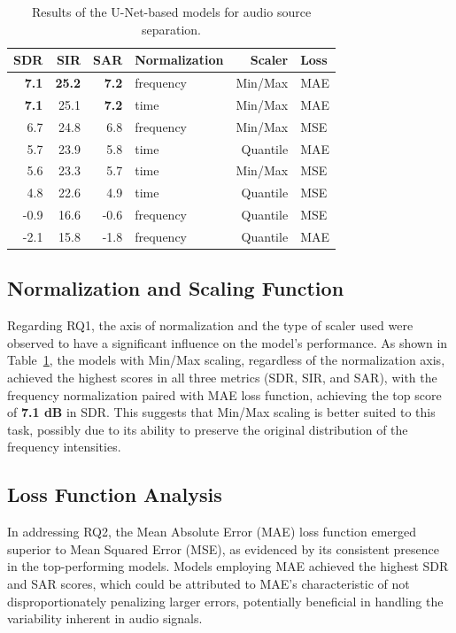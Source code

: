 \documentclass[conference]{IEEEtran}
\begin{document}
\begin{table}[htbp]
\centering
\caption{Results of the U-Net-based models for audio source separation.}
\label{table:results}
\begin{tabular}{rrrlrl}
\toprule
SDR & SIR & SAR & Normalization & Scaler & Loss \\
\midrule
\textbf{7.1} & \textbf{25.2} & \textbf{7.2} & frequency & Min/Max & MAE \\
\textbf{7.1} & 25.1 & \textbf{7.2} & time & Min/Max & MAE \\
6.7 & 24.8 & 6.8 & frequency & Min/Max & MSE \\
5.7 & 23.9 & 5.8 & time & Quantile & MAE \\
5.6 & 23.3 & 5.7 & time & Min/Max & MSE \\
4.8 & 22.6 & 4.9 & time & Quantile & MSE \\
-0.9 & 16.6 & -0.6 & frequency & Quantile & MSE \\
-2.1 & 15.8 & -1.8 & frequency & Quantile & MAE \\
\bottomrule
\end{tabular}
\end{table}


\subsection{Normalization and Scaling Function}

Regarding RQ1, the axis of normalization and the type of scaler used were observed to have a significant influence on the model's performance. As shown in Table~\ref{table:results}, the models with Min/Max scaling, regardless of the normalization axis, achieved the highest scores in all three metrics (SDR, SIR, and SAR), with the frequency normalization paired with MAE loss function, achieving the top score of \textbf{7.1 dB} in SDR. This suggests that Min/Max scaling is better suited to this task, possibly due to its ability to preserve the original distribution of the frequency intensities.

\subsection{Loss Function Analysis}

In addressing RQ2, the Mean Absolute Error (MAE) loss function emerged superior to Mean Squared Error (MSE), as evidenced by its consistent presence in the top-performing models. Models employing MAE achieved the highest SDR and SAR scores, which could be attributed to MAE's characteristic of not disproportionately penalizing larger errors, potentially beneficial in handling the variability inherent in audio signals.
\end{document}
